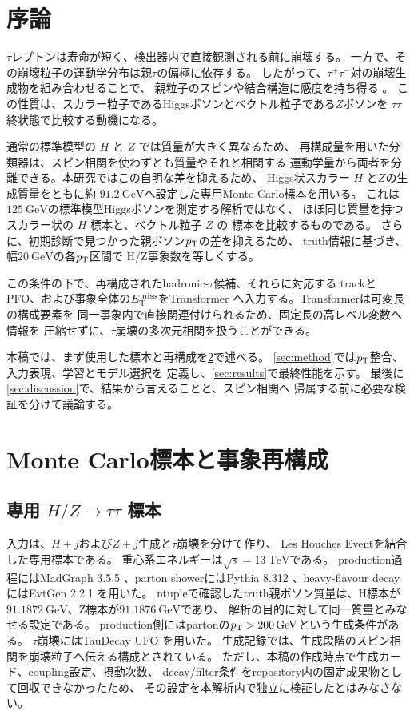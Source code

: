\documentclass[xelatex,ja=standard,a4paper,10pt,twocolumn]{bxjsarticle}
\begin{document}
\section{序論}
\label{sec:introduction}

\(\tau\)レプトンは寿命が短く、検出器内で直接観測される前に崩壊する。
一方で、その崩壊粒子の運動学分布は親\(\tau\)の偏極に依存する。
したがって、\(\tau^{+}\tau^{-}\)対の崩壊生成物を組み合わせることで、
親粒子のスピンや結合構造に感度を持ち得る
\cite{TauSpinner,TauSpinML}。
この性質は、スカラー粒子であるHiggsボソンとベクトル粒子である\(Z\)ボソンを
\(\tau\tau\)終状態で比較する動機になる。

通常の標準模型の \(H\) と \(Z\) では質量が大きく異なるため、
再構成量を用いた分類器は、スピン相関を使わずとも質量やそれと相関する
運動学量から両者を分離できる。本研究ではこの自明な差を抑えるため、
Higgs状スカラー \(H\) と\(Z\)の生成質量をともに約
\(\SI{91.2}{\GeV}\)へ設定した専用Monte Carlo標本を用いる。
これは\(\SI{125}{\GeV}\)の標準模型Higgsボソンを測定する解析ではなく、
ほぼ同じ質量を持つスカラー状の \(H\) 標本と、ベクトル粒子 \(Z\) の
標本を比較するものである。
さらに、初期診断で見つかった親ボソン\(p_{\mathrm{T}}\)の差を抑えるため、
truth情報に基づき、幅\(\SI{20}{\GeV}\)の各\(p_{\mathrm{T}}\)区間で
H/Z事象数を等しくする。

この条件の下で、再構成されたhadronic-\(\tau\)候補、それらに対応する
trackとPFO、および事象全体の\(E_{\mathrm{T}}^{\mathrm{miss}}\)をTransformer
\cite{Transformer}へ入力する。Transformerは可変長の構成要素を
同一事象内で直接関連付けられるため、固定長の高レベル変数へ情報を
圧縮せずに、\(\tau\)崩壊の多次元相関を扱うことができる。

本稿では、まず使用した標本と再構成を\cref{sec:samples}で述べる。
\cref{sec:method}では\(p_{\mathrm{T}}\)整合、入力表現、学習とモデル選択を
定義し、\cref{sec:results}で最終性能を示す。
最後に\cref{sec:discussion}で、結果から言えることと、スピン相関へ
帰属する前に必要な検証を分けて議論する。

\section{Monte Carlo標本と事象再構成}
\label{sec:samples}

\subsection{専用 \(H/Z\rightarrow\tau\tau\) 標本}

入力は、\(H+j\)および\(Z+j\)生成と\(\tau\)崩壊を分けて作り、
Les Houches Eventを結合した専用標本である。
重心系エネルギーは\(\sqrt{s}=\SI{13}{\TeV}\)である。
production過程にはMadGraph 3.5.5
\cite{MadGraph5}、parton showerにはPythia 8.312
\cite{Pythia82}、heavy-flavour decayにはEvtGen 2.2.1
\cite{EvtGen}を用いた。
ntupleで確認したtruth親ボソン質量は、H標本が
\(\SI{91.1872}{\GeV}\)、Z標本が\(\SI{91.1876}{\GeV}\)であり、
解析の目的に対して同一質量とみなせる設定である。
production側にはpartonの\(\pt>\SI{200}{\GeV}\)という生成条件がある。
\(\tau\)崩壊にはTauDecay UFO \cite{TauDecay}を用いた。
生成記録では、生成段階のスピン相関を崩壊粒子へ伝える構成とされている。
ただし、本稿の作成時点で生成カード、coupling設定、摂動次数、
decay/filter条件をrepository内の固定成果物として回収できなかったため、
その設定を本解析内で独立に検証したとはみなさない。
\end{document}
